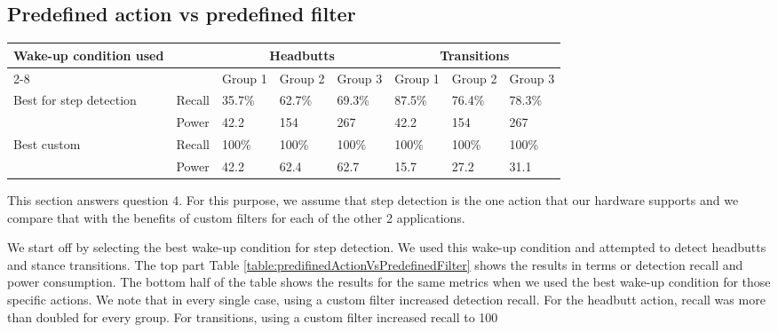 \subsection{Predefined action vs predefined filter}

\begin{table*}[t]
    \begin{tabular}{|l|l|l|l|l|l|l|l|}
    \hline
    \multirow{2}{*}{ Wake-up condition used}
							& \multirow{2}{*}{~}	& \multicolumn{3}{c|}{Headbutts} 	& \multicolumn{3}{c|}{Transitions} 	\\ \cline{2-8}
							&						& Group 1 	& Group 2	& Group 3 	& Group 1 	& Group 2	& Group 3 	\\ \hline
    \multirow{2}{*}{Best for step detection}
							& Recall 				& 35.7\%  	& 62.7\%    & 69.3\%  	& 87.5\% 	& 76.4\%	& 78.3\%  	\\ \cline{2-8}
							& Power  				& 42.2 		& 154       & 267     	& 42.2 		& 154		& 267     	\\ \hline
    \multirow{2}{*}{Best custom}
							& Recall 				& 100\%   	& 100\%     & 100\%   	& 100\%   	& 100\%		& 100\%   	\\ \cline{2-8}
							& Power  				& 42.2   	& 62.4      & 62.7    	& 15.7    	& 27.2		& 31.1    	\\ \hline
    \end{tabular}
	\caption{Detection recall and power consumption for the Headbutts and Transitions actions using fixed or custom wake-up conditions}
	\label{table:predifinedActionVsPredefinedFilter}
\end{table*}

This section answers question 4. For this purpose, we assume that step detection is the one action that our hardware supports and we compare that with the benefits of custom filters for each of the other 2 applications. 

We start off by selecting the best wake-up condition for step detection. We used this wake-up condition and attempted to detect headbutts and stance transitions. The top part Table \ref{table:predifinedActionVsPredefinedFilter} shows the results in terms or detection recall and power consumption. The bottom half of the table shows the results for the same metrics when we used the best wake-up condition for those specific actions. We note that in every single case, using a custom filter increased detection recall. For the headbutt action, recall was more than doubled for every group. For transitions, using a custom filter increased recall to 100%

